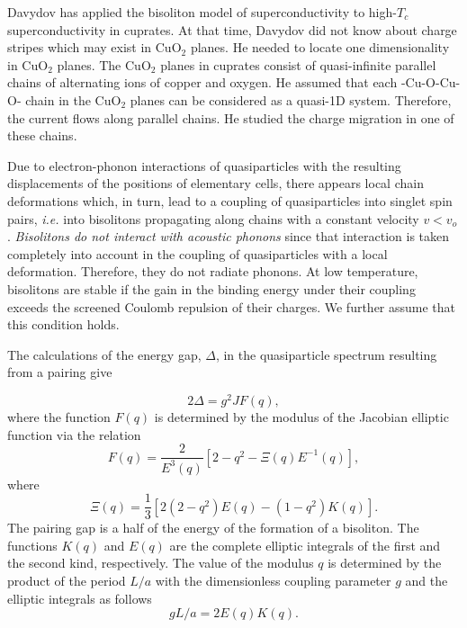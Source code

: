 Davydov has applied the bisoliton model of superconductivity to 
high-$T_{c}$ superconductivity in cuprates. At that time, Davydov did not 
know about charge stripes which may exist in CuO$_{2}$ planes. 
He needed to locate one dimensionality in CuO$_{2}$ planes. The CuO$_{2}$ 
planes in cuprates consist of quasi-infinite parallel chains of alternating 
ions of copper and oxygen. He assumed that each -Cu-O-Cu-O- 
chain in the CuO$_{2}$ planes can be considered as a quasi-1D system. 
Therefore, the current flows along parallel chains. He studied the charge 
migration in one of these chains.
 
Due to electron-phonon interactions of quasiparticles with the resulting
displacements of the positions of elementary cells, there appears local
chain deformations which, in turn, lead to a coupling of quasiparticles
into singlet spin pairs, {\em i.e.} into bisolitons propagating along chains 
with a constant velocity $v < v_{o}$. {\em Bisolitons do not interact with 
acoustic phonons} since that interaction is taken completely into account 
in the coupling of quasiparticles with a local deformation. Therefore, 
they do not radiate phonons. At low temperature, bisolitons are stable
if the gain in the binding energy under their coupling exceeds the screened
Coulomb repulsion of their charges. We further assume that this condition
holds. 

The calculations of the energy gap, $\Delta$, in the quasiparticle spectrum 
resulting from a pairing give

\begin{equation}
2\Delta = g^{2}JF(q), 
\end{equation}
where the function $F(q)$ is determined by the modulus of the Jacobian 
elliptic function via the relation
\begin{equation}
F(q) = \frac{2}{E^{3}(q)}[2-q^{2}-\Xi (q)E^{-1}(q)], 
\end{equation}
where 
\begin{equation}
\Xi (q) = \frac{1}{3}[2(2-q^{2})E(q)-(1-q^{2})K(q)]. 
\end{equation}
The pairing gap is a half of the energy of the formation of a 
bisoliton. The functions $K(q)$ and $E(q)$ are the complete elliptic integrals 
of the first and the second kind, respectively. The value of the modulus $q$ 
is determined by the product of the period $L/a$ with the dimensionless 
coupling parameter $g$ and the elliptic integrals as follows
\begin{equation}
gL/a = 2E(q)K(q).
\end{equation}


